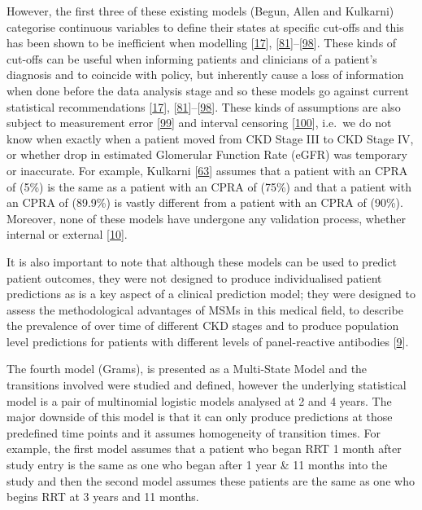 \documentclass[12pt,PhD,twoside,openright]{muthesis}
\begin{document}
However, the first three of these existing models (Begun, Allen and Kulkarni) categorise continuous variables to define their states at specific cut-offs and this has been shown to be inefficient when modelling {[}\protect\hyperlink{ref-royston_dichotomizing_2006}{17}{]}, {[}\protect\hyperlink{ref-altman_problems_1994-1}{81}{]}--{[}\protect\hyperlink{ref-weinberg_how_1995}{98}{]}. These kinds of cut-offs can be useful when informing patients and clinicians of a patient's diagnosis and to coincide with policy, but inherently cause a loss of information when done before the data analysis stage and so these models go against current statistical recommendations {[}\protect\hyperlink{ref-royston_dichotomizing_2006}{17}{]}, {[}\protect\hyperlink{ref-altman_problems_1994-1}{81}{]}--{[}\protect\hyperlink{ref-weinberg_how_1995}{98}{]}. These kinds of assumptions are also subject to measurement error {[}\protect\hyperlink{ref-van_smeden_reflection_2019}{99}{]} and interval censoring {[}\protect\hyperlink{ref-sun_interval_2005}{100}{]}, i.e.~we do not know when exactly when a patient moved from CKD Stage III to CKD Stage IV, or whether drop in estimated Glomerular Function Rate (eGFR) was temporary or inaccurate. For example, Kulkarni {[}\protect\hyperlink{ref-kulkarni_transition_2017}{63}{]} assumes that a patient with an CPRA of (5\%) is the same as a patient with an CPRA of (75\%) and that a patient with an CPRA of (89.9\%) is vastly different from a patient with an CPRA of (90\%). Moreover, none of these models have undergone any validation process, whether internal or external {[}\protect\hyperlink{ref-altman_prognosis_2009}{10}{]}.

It is also important to note that although these models can be used to predict patient outcomes, they were not designed to produce individualised patient predictions as is a key aspect of a clinical prediction model; they were designed to assess the methodological advantages of MSMs in this medical field, to describe the prevalence of over time of different CKD stages and to produce population level predictions for patients with different levels of panel-reactive antibodies {[}\protect\hyperlink{ref-royston_prognosis_2009}{9}{]}.

The fourth model (Grams), is presented as a Multi-State Model and the transitions involved were studied and defined, however the underlying statistical model is a pair of multinomial logistic models analysed at 2 and 4 years. The major downside of this model is that it can only produce predictions at those predefined time points and it assumes homogeneity of transition times. For example, the first model assumes that a patient who began RRT 1 month after study entry is the same as one who began after 1 year \& 11 months into the study and then the second model assumes these patients are the same as one who begins RRT at 3 years and 11 months.
\end{document}
